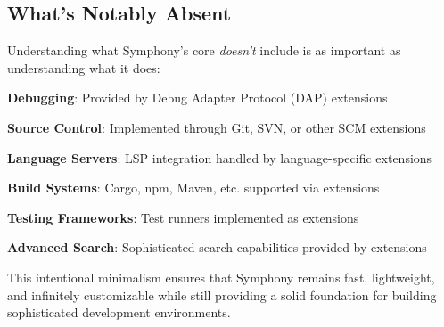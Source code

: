 \subsection*{What's Notably Absent}

Understanding what Symphony's core \textit{doesn't} include is as important as understanding what it does:

\begin{compactlist}
    \item \textbf{Debugging}: Provided by Debug Adapter Protocol (DAP) extensions
    \item \textbf{Source Control}: Implemented through Git, SVN, or other SCM extensions
    \item \textbf{Language Servers}: LSP integration handled by language-specific extensions
    \item \textbf{Build Systems}: Cargo, npm, Maven, etc. supported via extensions
    \item \textbf{Testing Frameworks}: Test runners implemented as extensions
    \item \textbf{Advanced Search}: Sophisticated search capabilities provided by extensions
\end{compactlist}

This intentional minimalism ensures that Symphony remains fast, lightweight, and infinitely customizable while still providing a solid foundation for building sophisticated development environments.
